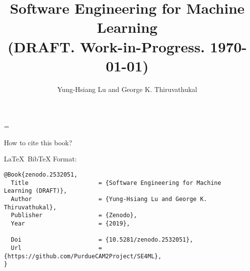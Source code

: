 

\begin{comment}

to find all files that contain a term (useful for creating index)

grep -r term * | grep tex | sed 's/:/ /g' | awk '{print $1}' | sort | uniq

\end{comment}

\newcommand{\progpath}{\basepath/programs}

\makeatletter
\def\seealso#1#2{{\em see also\/} #1, #2}
\makeatother

\title{Software Engineering for Machine Learning \\
{\Large (DRAFT. Work-in-Progress.  \today)}}
\author{Yung-Hsiang Lu and
George K. Thiruvathukal}

%
%

\emergencystretch=\maxdimen
{}



\begin{comment}
reduce space

titlesec
http://www.ctex.org/documents/packages/layout/titlesec.pdf
wrapfig

\end{comment}

\maketitle

   
\clearpage
\vspace*{\fill}
How to cite this book?

\LaTeX\ BibTeX Format: 

\begin{verbatim}
@Book{zenodo.2532051,
  Title                    = {Software Engineering for Machine Learning (DRAFT)},
  Author                   = {Yung-Hsiang Lu and George K. Thiruvathukal},
  Publisher                = {Zenodo},
  Year                     = {2019},

  Doi                      = {10.5281/zenodo.2532051},
  Url                      = {https://github.com/PurdueCAM2Project/SE4ML},
}
\end{verbatim}

